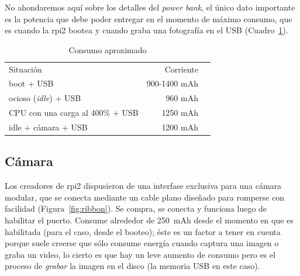 \documentclass[10pt,a4paper]{article}
\begin{document}
No ahondaremos aqu\'i sobre los detalles del \emph{power bank}, el \'unico dato importante es la potencia que debe poder entregar en el momento de m\'aximo consumo, que es cuando la rpi2 bootea y cuando graba una fotograf\'ia en el USB (Cuadro~\ref{tab:energia}).

\begin{table}[h!]
    \begin{center}
        \begin{tabular}{lll}
        \cline{1-2}
        \multicolumn{1}{|l|}{\cellcolor[HTML]{EFEFEF}Situaci\'on}   & \multicolumn{1}{r|}{\cellcolor[HTML]{EFEFEF}Corriente}    & \\
        \cline{1-2}
        \multicolumn{1}{|l|}{boot + USB}                            & \multicolumn{1}{r|}{900-1400 mAh}                         & \\
        \cline{1-2}
        \multicolumn{1}{|l|}{ocioso (\emph{idle}) + USB}            & \multicolumn{1}{r|}{960 mAh}                              & \\
        \cline{1-2}
        \multicolumn{1}{|l|}{CPU con una carga al 400\% + USB}      & \multicolumn{1}{r|}{1250 mAh}                             & \\
        \cline{1-2}
        \multicolumn{1}{|l|}{idle + c\'amara + USB}                 & \multicolumn{1}{r|}{1200 mAh}                             &
        \end{tabular}
    \end{center}
    \caption{Consumo aproximado}
    \label{tab:energia}
\end{table}

\subsection{C\'amara}

Los creadores de rpi2 dispusieron de una interfase exclusiva para una c\'amara modular, que se conecta mediante un cable plano dise\~nado para romperse con facilidad (Figura~\ref{fig:ribbon}). Se compra, se conecta y funciona luego de habilitar el puerto. Consume alrededor de \SI{250}{mAh} desde el momento en que es habilitada (para el caso, desde el booteo); \'este es un factor a tener en cuenta porque suele creerse que s\'olo consume energ\'ia cuando captura una imagen o graba un video, lo cierto es que hay un leve aumento de consumo pero es el proceso de \emph{grabar} la imagen en el disco (la memoria USB en este caso).\\
\end{document}
